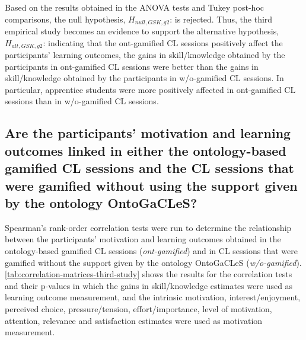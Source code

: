 Based on the results obtained in the ANOVA tests and Tukey post-hoc comparisons, the null hypothesis, $H_{null,GSK,g2}$:  is rejected. Thus, the third empirical study becomes an evidence to support the alternative hypothesis, $H_{alt,GSK,g2}$:  indicating that the ont-gamified CL sessions positively affect the participants' learning outcomes, the gains in skill/knowledge obtained by the participants in ont-gamified CL sessions were better than the gains in skill/knowledge obtained by the participants in w/o-gamified CL sessions. In particular, apprentice students were more positively affected in ont-gamified CL sessions than in w/o-gamified CL sessions.

\subsection*{Are the participants' motivation and learning outcomes linked in either the ontology-based gamified CL sessions and the CL sessions that were gamified without using the support given by the ontology OntoGaCLeS?}

Spearman's rank-order correlation tests were run to determine the relationship between the participants' motivation and learning outcomes obtained in the ontology-based gamified CL sessions (\emph{ont-gamified}) and in CL sessions that were gamified without the support given by the ontology OntoGaCLeS (\emph{w/o-gamified}). \autoref{tab:correlation-matrices-third-study} shows the results for the correlation tests and their p-values in which
the gains in skill/knowledge estimates were used as learning outcome measurement, and the intrinsic motivation, interest/enjoyment, perceived choice, pressure/tension, effort/importance, level of motivation, attention, relevance and satisfaction estimates were used as motivation measurement.



